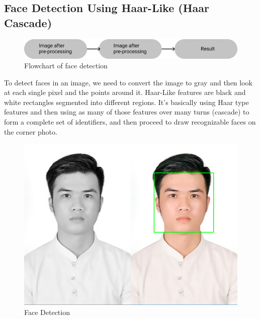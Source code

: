    \subsection{Face Detection Using Haar-Like (Haar Cascade)}
        \begin{figure}[H]
            \centering
            \includegraphics[width=0.6\linewidth]{img/Haar.png}
            \caption{Flowchart of face detection}
        \end{figure}
        To detect faces in an image, we need to convert the image to gray and then look at each single pixel and the points around it. Haar-Like 
        features are black and white rectangles segmented into different regions. It's basically using Haar type features and then using as many 
        of those features over many turns (cascade) to form a complete set of identifiers, and then proceed to draw recognizable faces on the 
        corner photo.
        \begin{figure}[H]
            \centering
            \includegraphics[width=0.6\linewidth]{img/Faces found.png}
            \caption{Face Detection}
        \end{figure}


